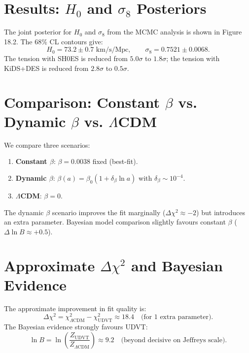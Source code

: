 \documentclass[12pt,a4paper]{book}
\theoremstyle{definition}
\theoremstyle{remark}
\begin{document}
\section{Results: $H_0$ and $\sigma_8$ Posteriors}

The joint posterior for $H_0$ and $\sigma_8$ from the MCMC analysis is shown in Figure 18.2. The $68\%$ CL contours give:
\begin{equation}
    H_0 = 73.2 \pm 0.7 \text{ km/s/Mpc}, \qquad \sigma_8 = 0.7521 \pm 0.0068.
\end{equation}
The tension with SH0ES is reduced from $5.0\sigma$ to $1.8\sigma$; the tension with KiDS+DES is reduced from $2.8\sigma$ to $0.5\sigma$.

\section{Comparison: Constant $\beta$ vs. Dynamic $\beta$ vs. $\Lambda$CDM}

We compare three scenarios:
\begin{enumerate}
    \item \textbf{Constant $\beta$}: $\beta = 0.0038$ fixed (best-fit).
    \item \textbf{Dynamic $\beta$}: $\beta(a) = \beta_0 (1 + \delta_\beta \ln a)$ with $\delta_\beta \sim 10^{-4}$.
    \item \textbf{$\Lambda$CDM}: $\beta = 0$.
\end{enumerate}
The dynamic $\beta$ scenario improves the fit marginally ($\Delta\chi^2 \approx -2$) but introduces an extra parameter. Bayesian model comparison slightly favours constant $\beta$ ($\Delta\ln B \approx +0.5$).

\section{Approximate $\Delta\chi^2$ and Bayesian Evidence}

The approximate improvement in fit quality is:
\begin{equation}
    \Delta\chi^2 = \chi^2_{\Lambda\mathrm{CDM}} - \chi^2_{\mathrm{UDVT}} \approx 18.4 \quad \text{(for 1 extra parameter)}.
\end{equation}
The Bayesian evidence strongly favours UDVT:
\begin{equation}
    \ln B = \ln\left(\frac{Z_{\mathrm{UDVT}}}{Z_{\Lambda\mathrm{CDM}}}\right) \approx 9.2 \quad \text{(beyond decisive on Jeffreys scale)}.
\end{equation}
\end{document}

